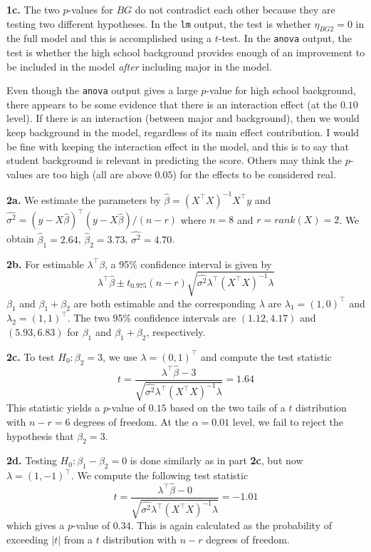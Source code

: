 \documentclass[12pt]{article}
\begin{document}
\noindent \textbf{1c.} The two $p$-values for $BG$ do not contradict each other because they are testing two different hypotheses. In the \texttt{lm} output, the test is whether $\eta_{BG2}=0$ in the full model and this is accomplished using a $t$-test. In the \texttt{anova} output, the test is whether the high school background provides enough of an improvement to be included in the model \emph{after} including major in the model.
\bigskip

\noindent Even though the \texttt{anova} output gives a large $p$-value for high school background, there appears to be some evidence that there is an interaction effect (at the $0.10$ level). If there is an interaction (between major and background), then we would keep background in the model, regardless of its main effect contribution. I would be fine with keeping the interaction effect in the model, and this is to say that student background is relevant in predicting the score. Others may think the $p$-values are too high (all are above $0.05$) for the effects to be considered real.
\bigskip
\bigskip
\bigskip

\noindent \textbf{2a.} 
We estimate the parameters by $\hat{\beta}=(X^\top X)^{-1}X^\top y$ and $\hat{\sigma^2}=(y-X\hat{\beta})^\top(y-X\hat{\beta})/(n-r)$ where $n=8$ and $r=rank(X)=2$. We obtain $\hat{\beta}_1 = 2.64$, $\hat{\beta}_2 = 3.73$, $\hat{\sigma^2} = 4.70$.
\bigskip

\noindent \textbf{2b.} For estimable $\lambda^\top\beta$, a 95\% confidence interval is given by
\[ \lambda^\top\hat{\beta} \pm t_{0.975}(n-r)\sqrt{\hat{\sigma^2}\lambda^\top(X^\top X)^{-1}\lambda} \]
$\beta_1$ and $\beta_1+\beta_2$ are both estimable and the corresponding $\lambda$ are $\lambda_1=(1, 0)^\top$ and $\lambda_2=(1, 1)^\top$. The two 95\% confidence intervals are $(1.12, 4.17)$ and $(5.93, 6.83)$ for $\beta_1$ and $\beta_1+\beta_2$, respectively.
\bigskip

\noindent \textbf{2c.} To test $H_0:\beta_2=3$, we use $\lambda=(0, 1)^\top$ and compute the test statistic
\[ t=\frac{\lambda^\top\hat{\beta} - 3}{\sqrt{\hat{\sigma^2}\lambda^\top(X^\top X)^{-1}\lambda}}=1.64 \]
This statistic yields a $p$-value of $0.15$ based on the two tails of a $t$ distribution with $n-r=6$ degrees of freedom. At the $\alpha=0.01$ level, we fail to reject the hypothesis that $\beta_2=3$.
\bigskip

\noindent \textbf{2d.} Testing $H_0:\beta_1-\beta_2=0$ is done similarly as in part \textbf{2c}, but now $\lambda=(1,-1)^\top$. We compute the following test statistic
\[ t=\frac{\lambda^\top\hat{\beta} - 0}{\sqrt{\hat{\sigma^2}\lambda^\top(X^\top X)^{-1}\lambda}}=-1.01 \]
which gives a $p$-value of $0.34$. This is again calculated as the probability of exceeding $|t|$ from a $t$ distribution with $n-r$ degrees of freedom.
\bigskip
\bigskip
\bigskip
\end{document}
